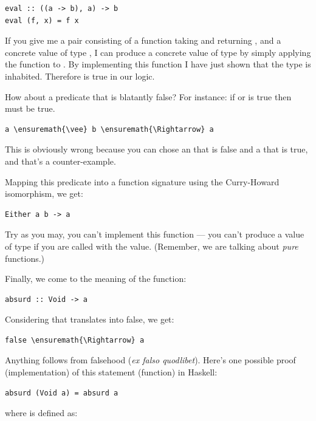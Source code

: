 \begin{Verbatim}[commandchars=\\\{\}]
eval :: ((a -> b), a) -> b
eval (f, x) = f x
\end{Verbatim}
If you give me a pair consisting of a function  taking
 and returning , and a concrete value  of
type , I can produce a concrete value of type  by
simply applying the function  to . By implementing
this function I have just shown that the type
 is inhabited.
Therefore  is true in our logic.

How about a predicate that is blatantly false? For instance: if
 or  is true then  must be true.

\begin{Verbatim}[commandchars=\\\{\}]
a \ensuremath{\vee} b \ensuremath{\Rightarrow} a
\end{Verbatim}
This is obviously wrong because you can chose an  that is
false and a  that is true, and that's a counter-example.

Mapping this predicate into a function signature using the Curry-Howard
isomorphism, we get:

\begin{Verbatim}[commandchars=\\\{\}]
Either a b -> a
\end{Verbatim}
Try as you may, you can't implement this function --- you can't produce
a value of type  if you are called with the 
value. (Remember, we are talking about \emph{pure} functions.)

Finally, we come to the meaning of the  function:

\begin{Verbatim}[commandchars=\\\{\}]
absurd :: Void -> a
\end{Verbatim}
Considering that  translates into false, we get:

\begin{Verbatim}[commandchars=\\\{\}]
false \ensuremath{\Rightarrow} a
\end{Verbatim}
Anything follows from falsehood (\emph{ex falso quodlibet}). Here's one
possible proof (implementation) of this statement (function) in Haskell:

\begin{Verbatim}[commandchars=\\\{\}]
absurd (Void a) = absurd a
\end{Verbatim}
where  is defined as:

